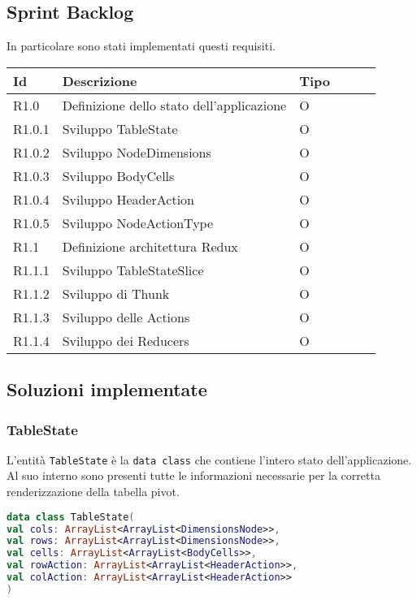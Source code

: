 \subsection{Sprint Backlog}
In particolare sono stati implementati questi requisiti.
\begin{longtable} {
		|>{}p{10mm}| 
		|>{}p{90mm}|
		|>{}p{15mm}|
		|>{}p{15mm}|
		|>{}p{15mm}|
		>{}p{0mm}}
	\hline
	\textbf{Id} & \textbf{Descrizione} & \textbf{Tipo} \\ \hline
	R1.0 & Definizione dello stato dell'applicazione & O \\ \hline
	R1.0.1 & Sviluppo TableState        & O\\ \hline
	R1.0.2 & Sviluppo NodeDimensions    & O\\ \hline
	R1.0.3 & Sviluppo BodyCells         & O\\ \hline
	R1.0.4 & Sviluppo HeaderAction      & O\\ \hline
	R1.0.5 & Sviluppo NodeActionType    & O\\ \hline
	R1.1   & Definizione architettura Redux & O\\ \hline
	R1.1.1 & Sviluppo TableStateSlice    & O\\ \hline
	R1.1.2 & Sviluppo di Thunk & O\\ \hline
	R1.1.3 & Sviluppo delle Actions & O\\ \hline
	R1.1.4 & Sviluppo dei Reducers & O\\ \hline
\end{longtable}

\subsection{Soluzioni implementate}
\subsubsection{TableState}
L'entità \verb|TableState| è la \verb|data class| che contiene l'intero stato dell'applicazione. Al suo interno sono presenti tutte le informazioni necessarie per la corretta renderizzazione della tabella pivot.
\begin{lstlisting}[caption={TableState}, label={lst:tablestate}, language=Kotlin]
data class TableState(
val cols: ArrayList<ArrayList<DimensionsNode>>,
val rows: ArrayList<ArrayList<DimensionsNode>>,
val cells: ArrayList<ArrayList<BodyCells>>,
val rowAction: ArrayList<ArrayList<HeaderAction>>,
val colAction: ArrayList<ArrayList<HeaderAction>>
)
\end{lstlisting}

